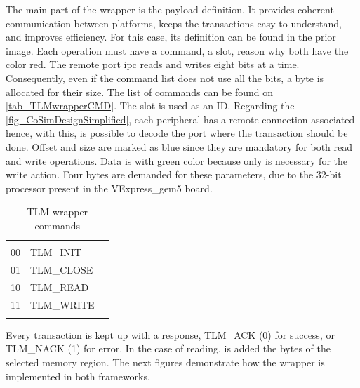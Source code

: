 The main part of the wrapper is the payload definition. It provides coherent communication between platforms, keeps the transactions
easy to understand, and improves efficiency. For this case, its definition can be found in the prior image. Each operation must 
have a command, a slot, reason why both have the color red. The remote port \gls{ipc} reads and writes eight bits at a time. 
Consequently, even if the command list does not use all the bits, a byte is allocated for their size. The list of commands can be found on
\autoref{tab_TLMwrapperCMD}. The slot is used as an ID. Regarding the \autoref{fig_CoSimDesignSimplified}, each peripheral has a remote 
connection associated hence, with this, is possible to decode the port where the transaction should be done. Offset and size are 
marked as blue since they are mandatory for both read and write operations. 
Data is with green color because only is necessary for the write action. Four bytes are demanded for these parameters, due to the 32-bit
processor present in the VExpress\_gem5 board.

\begin{table}[h!]
	\centering
	\begin{tabular}{lll}
	\cline{1-2}
	\multicolumn{1}{|l|}{\cellcolor[HTML]{C0C0C0}{\color[HTML]{000000} Bits}} & \multicolumn{1}{l|}{\cellcolor[HTML]{C0C0C0}{\color[HTML]{000000} Command}} &  \\ \cline{1-2}
	\multicolumn{1}{|l|}{00} & \multicolumn{1}{l|}{TLM\_INIT} &  \\ \cline{1-2}
	\multicolumn{1}{|l|}{01} & \multicolumn{1}{l|}{TLM\_CLOSE} &  \\ \cline{1-2}
	\multicolumn{1}{|l|}{10} & \multicolumn{1}{l|}{TLM\_READ} &  \\ \cline{1-2}
	\multicolumn{1}{|l|}{11} & \multicolumn{1}{l|}{TLM\_WRITE} &  \\ \cline{1-2}
	 &  & 
	\end{tabular}%
	\caption{TLM wrapper commands}
	\label{tab_TLMwrapperCMD}
\end{table}

Every transaction is kept up with a response, TLM\_ACK (0) for success, or TLM\_NACK (1) for error. In the case of reading, is added the 
bytes of the selected memory region. The next figures demonstrate how the wrapper is implemented in both frameworks.

